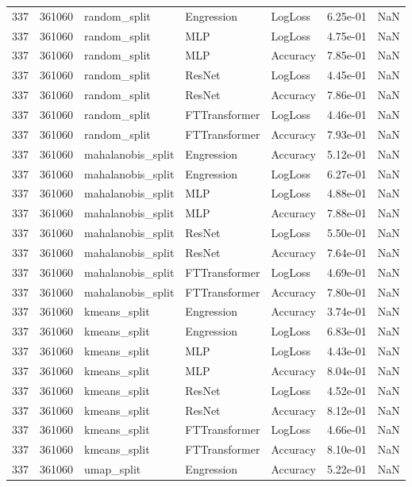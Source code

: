\begin{tabular}{rrlllrr}
337 & 361060 & random\_split & Engression & LogLoss & 6.25e-01 & NaN \\
337 & 361060 & random\_split & MLP & LogLoss & 4.75e-01 & NaN \\
337 & 361060 & random\_split & MLP & Accuracy & 7.85e-01 & NaN \\
337 & 361060 & random\_split & ResNet & LogLoss & 4.45e-01 & NaN \\
337 & 361060 & random\_split & ResNet & Accuracy & 7.86e-01 & NaN \\
337 & 361060 & random\_split & FTTransformer & LogLoss & 4.46e-01 & NaN \\
337 & 361060 & random\_split & FTTransformer & Accuracy & 7.93e-01 & NaN \\
337 & 361060 & mahalanobis\_split & Engression & Accuracy & 5.12e-01 & NaN \\
337 & 361060 & mahalanobis\_split & Engression & LogLoss & 6.27e-01 & NaN \\
337 & 361060 & mahalanobis\_split & MLP & LogLoss & 4.88e-01 & NaN \\
337 & 361060 & mahalanobis\_split & MLP & Accuracy & 7.88e-01 & NaN \\
337 & 361060 & mahalanobis\_split & ResNet & LogLoss & 5.50e-01 & NaN \\
337 & 361060 & mahalanobis\_split & ResNet & Accuracy & 7.64e-01 & NaN \\
337 & 361060 & mahalanobis\_split & FTTransformer & LogLoss & 4.69e-01 & NaN \\
337 & 361060 & mahalanobis\_split & FTTransformer & Accuracy & 7.80e-01 & NaN \\
337 & 361060 & kmeans\_split & Engression & Accuracy & 3.74e-01 & NaN \\
337 & 361060 & kmeans\_split & Engression & LogLoss & 6.83e-01 & NaN \\
337 & 361060 & kmeans\_split & MLP & LogLoss & 4.43e-01 & NaN \\
337 & 361060 & kmeans\_split & MLP & Accuracy & 8.04e-01 & NaN \\
337 & 361060 & kmeans\_split & ResNet & LogLoss & 4.52e-01 & NaN \\
337 & 361060 & kmeans\_split & ResNet & Accuracy & 8.12e-01 & NaN \\
337 & 361060 & kmeans\_split & FTTransformer & LogLoss & 4.66e-01 & NaN \\
337 & 361060 & kmeans\_split & FTTransformer & Accuracy & 8.10e-01 & NaN \\
337 & 361060 & umap\_split & Engression & Accuracy & 5.22e-01 & NaN \\

\end{tabular}
